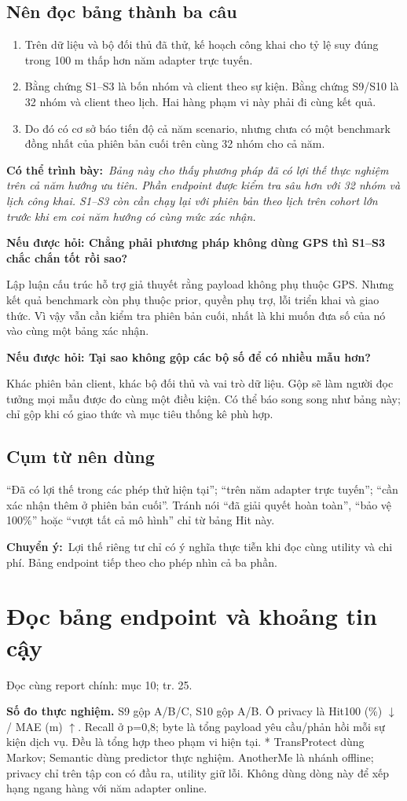 \documentclass[10pt,a4paper]{article}
\newcommand{\say}[1]{\par\textbf{Có thể trình bày:}\ \textit{#1}\par}
\newcommand{\ask}[2]{\par\textbf{Nếu được hỏi: #1}\par #2\par}
\newcommand{\where}[1]{\par{\small\color{gray}Đọc cùng report chính: #1.}\par}
\newcommand{\transition}[1]{\par\textbf{Chuyển ý:}\ #1\par}
\newcommand{\guidepage}[1]{\clearpage\section{#1}}
\begin{document}
\subsection*{Nên đọc bảng thành ba câu}
\begin{enumerate}
\item Trên dữ liệu và bộ đối thủ đã thử, kế hoạch công khai cho tỷ lệ suy đúng trong 100 m thấp hơn năm adapter trực tuyến.
\item Bằng chứng S1--S3 là bốn nhóm và client theo sự kiện. Bằng chứng S9/S10 là 32 nhóm và client theo lịch. Hai hàng phạm vi này phải đi cùng kết quả.
\item Do đó có cơ sở báo tiến độ cả năm scenario, nhưng chưa có một benchmark đồng nhất của phiên bản cuối trên cùng 32 nhóm cho cả năm.
\end{enumerate}

\say{Bảng này cho thấy phương pháp đã có lợi thế thực nghiệm trên cả năm hướng ưu tiên. Phần endpoint được kiểm tra sâu hơn với 32 nhóm và lịch công khai. S1--S3 còn cần chạy lại với phiên bản theo lịch trên cohort lớn trước khi em coi năm hướng có cùng mức xác nhận.}

\ask{Chẳng phải phương pháp không dùng GPS thì S1--S3 chắc chắn tốt rồi sao?}{Lập luận cấu trúc hỗ trợ giả thuyết rằng payload không phụ thuộc GPS. Nhưng kết quả benchmark còn phụ thuộc prior, quyền phụ trợ, lỗi triển khai và giao thức. Vì vậy vẫn cần kiểm tra phiên bản cuối, nhất là khi muốn đưa số của nó vào cùng một bảng xác nhận.}

\ask{Tại sao không gộp các bộ số để có nhiều mẫu hơn?}{Khác phiên bản client, khác bộ đối thủ và vai trò dữ liệu. Gộp sẽ làm người đọc tưởng mọi mẫu được đo cùng một điều kiện. Có thể báo song song như bảng này; chỉ gộp khi có giao thức và mục tiêu thống kê phù hợp.}

\subsection*{Cụm từ nên dùng}
``Đã có lợi thế trong các phép thử hiện tại''; ``trên năm adapter trực tuyến''; ``cần xác nhận thêm ở phiên bản cuối''. Tránh nói ``đã giải quyết hoàn toàn'', ``bảo vệ 100\%'' hoặc ``vượt tất cả mô hình'' chỉ từ bảng Hit này.
\transition{Lợi thế riêng tư chỉ có ý nghĩa thực tiễn khi đọc cùng utility và chi phí. Bảng endpoint tiếp theo cho phép nhìn cả ba phần.}

\guidepage{Đọc bảng endpoint và khoảng tin cậy}
\where{mục 10; tr. 25}
\textbf{Số đo thực nghiệm.} S9 gộp A/B/C, S10 gộp A/B. Ô privacy là Hit100 (\%) $\downarrow$ / MAE (m) $\uparrow$. Recall ở p=0,8; byte là tổng payload yêu cầu/phản hồi mỗi sự kiện dịch vụ. Đều là tổng hợp theo phạm vi hiện tại.
\EndpointEvidence
* TransProtect dùng Markov; Semantic dùng predictor thực nghiệm. AnotherMe là nhánh offline; privacy chỉ trên tập con có đầu ra, utility giữ lỗi. Không dùng dòng này để xếp hạng ngang hàng với năm adapter online.
\end{document}
